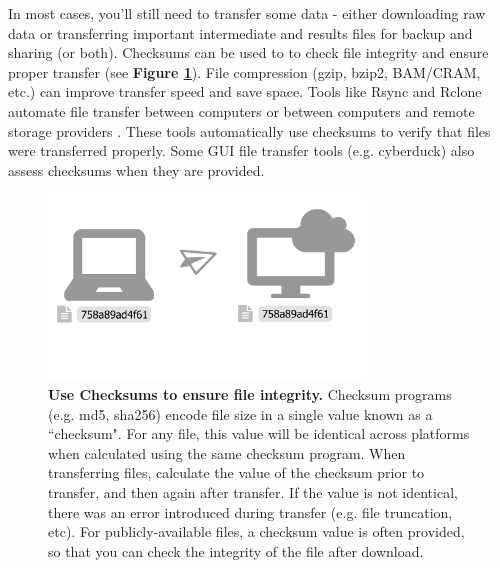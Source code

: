 \documentclass[10pt,letterpaper]{article}
\begin{document}
In most cases, you'll still need to transfer some data - either downloading raw data or transferring important intermediate and results files for backup and sharing (or both). 
Checksums can be used to to check file integrity and ensure proper transfer (see \textbf{Figure \ref{fig:checksum}}).
File compression (gzip, bzip2, BAM/CRAM, etc.) can improve transfer speed and save space.
Tools like Rsync and Rclone automate file transfer between computers or between computers and remote storage providers \cite{bailleul2016rclone}. 
These tools automatically use checksums to verify that files were transferred properly.
Some GUI file transfer tools (e.g. cyberduck) also assess checksums when they are provided.

\begin{figure}
\centering
\includegraphics[width=0.75\textwidth]{figures/checksum.pdf}
\caption{\textbf{Use Checksums to ensure file integrity.} Checksum programs (e.g. md5, sha256) encode file size in a single value known as a ``checksum".
For any file, this value will be identical across platforms when calculated using the same checksum program. %
When transferring files, calculate the value of the checksum prior to transfer, and then again after transfer.
If the value is not identical, there was an error introduced during transfer (e.g. file truncation, etc).
For publicly-available files, a checksum value is often provided, so that you can check the integrity of the file after download.
 } 
\label{fig:checksum}
\end{figure}
\end{document}
